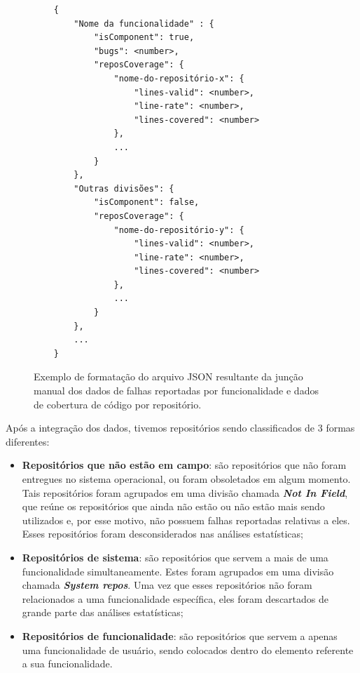 \documentclass[11.5pt]{article}
\begin{document}
\begin{figure}[ht]
\caption{Exemplo de formatação do arquivo JSON resultante da junção manual dos dados de falhas
reportadas por funcionalidade e dados de cobertura de código por repositório.}
\label{fig:formatoJsonFinal}
\small
\begin{verbatim}
    {
        "Nome da funcionalidade" : {
            "isComponent": true,
            "bugs": <number>,
            "reposCoverage": {
                "nome-do-repositório-x": {
                    "lines-valid": <number>,
                    "line-rate": <number>,
                    "lines-covered": <number>
                },
                ...
            }
        },
        "Outras divisões": {
            "isComponent": false,
            "reposCoverage": {
                "nome-do-repositório-y": {
                    "lines-valid": <number>,
                    "line-rate": <number>,
                    "lines-covered": <number>
                },
                ...
            }
        },
        ...
    }
\end{verbatim}
\end{figure}

Após a integração dos dados, tivemos repositórios sendo classificados de 3 formas diferentes:
\begin{itemize}
    \item \textbf{Repositórios que não estão em campo}:
          são repositórios que não foram entregues no sistema operacional, ou foram obsoletados em
          algum momento. Tais repositórios foram agrupados em uma divisão chamada
          \textbf{\textit{Not In Field}}, que reúne os repositórios que ainda não estão ou não estão
          mais sendo utilizados e, por esse motivo, não possuem falhas reportadas relativas a eles.
          Esses repositórios foram desconsiderados nas análises estatísticas;

    \item \textbf{Repositórios de sistema}:
          são repositórios que servem a mais de uma funcionalidade simultaneamente.
          Estes foram agrupados em uma divisão chamada \textbf{\textit{System repos}}.
          Uma vez que esses repositórios não foram relacionados a uma funcionalidade específica, eles
          foram descartados de grande parte das análises estatísticas;

    \item \textbf{Repositórios de funcionalidade}:
          são repositórios que servem a apenas uma funcionalidade de usuário, sendo colocados dentro
          do elemento referente a sua funcionalidade.
\end{itemize}
\end{document}
